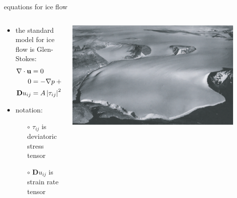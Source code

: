 \documentclass[hide notes,intlimits]{beamer}
\begin{document}
\begin{frame}{equations for ice flow}

\begin{columns}
\begin{column}{0.65\textwidth}
\begin{itemize}
\item the \alert{standard model for ice flow} is Glen-Stokes:
\begin{align*}
\nabla \cdot \mathbf{u} &= 0 &&\text{\emph{incompressibility}} \\
0 &= - \nabla p + \nabla \cdot \tau_{ij} + \rho \mathbf{g} &&\text{\emph{stress balance}} \\
\mathbf{D}u_{ij} &= A \left|\tau_{ij}\right|^2 \tau_{ij} &&\text{\emph{Glen flow law}}
\end{align*}
\item notation:
  \begin{itemize}
  \item[$\circ$] $\tau_{ij}$ is deviatoric stress tensor
  \item[$\circ$] $\mathbf{D}u_{ij}$ is strain rate tensor
  \end{itemize}
\end{itemize}
\end{column}
\begin{column}{0.35\textwidth}

\hfill\includegraphics[width=0.9\textwidth]{polaris}

\bigskip\bigskip


\end{column}
\end{columns}
\end{frame}
\end{document}
